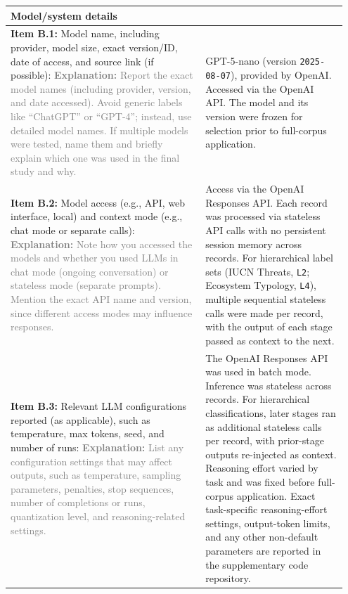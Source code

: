 \documentclass[12pt]{article}
\begin{document}
\begin{landscape}
{\begin{longtable}{|p{0.55\linewidth}|p{0.40\linewidth}|}
\\
\hline
\multicolumn{2}{|l|}{\cellcolor{green!20}\textbf{Model/system details}} \\
\hline
\textbf{Item B.1:} Model name, including provider, model size, exact version/ID, date of access, and source link (if possible): \textcolor{gray}{{\footnotesize \textbf{Explanation:} Report the exact model names (including provider, version, and date accessed). Avoid generic labels like ``ChatGPT'' or ``GPT-4''; instead, use detailed model names. If multiple models were tested, name them and briefly explain which one was used in the final study and why.}} & GPT-5-nano (version \texttt{2025-08-07}), provided by OpenAI. Accessed via the OpenAI API. The model and its version were frozen for selection prior to full-corpus application. \\
\hline
\textbf{Item B.2:} Model access (e.g., API, web interface, local) and context mode (e.g., chat mode or separate calls): \textcolor{gray}{{\footnotesize \textbf{Explanation:} Note how you accessed the models and whether you used LLMs in chat mode (ongoing conversation) or stateless mode (separate prompts). Mention the exact API name and version, since different access modes may influence responses.}} & Access via the OpenAI Responses API. Each record was processed via stateless API calls with no persistent session memory across records. For hierarchical label sets (IUCN Threats, \texttt{L2}; Ecosystem Typology, \texttt{L4}), multiple sequential stateless calls were made per record, with the output of each stage passed as context to the next. \\
\hline
\textbf{Item B.3:} Relevant LLM configurations reported (as applicable), such as temperature, max tokens, seed, and number of runs: \textcolor{gray}{{\footnotesize \textbf{Explanation:} List any configuration settings that may affect outputs, such as temperature, sampling parameters, penalties, stop sequences, number of completions or runs, quantization level, and reasoning-related settings.}} & The OpenAI Responses API was used in batch mode. Inference was stateless across records. For hierarchical classifications, later stages ran as additional stateless calls per record, with prior-stage outputs re-injected as context. Reasoning effort varied by task and was fixed before full-corpus application. Exact task-specific reasoning-effort settings, output-token limits, and any other non-default parameters are reported in the supplementary code repository. \\
\hline

\end{longtable}}
\end{landscape}
\end{document}
